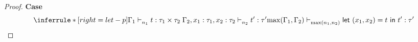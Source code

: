 \documentclass{article}
\begin{document}
\begin{proof}
   
   \noindent \textbf{Case} 
   \[
      \inferrule*[ right = let-p ]
   {\Gamma_1 \jtype{n_1}{}{t}{\tau_1 \times \tau_2 } \\ \Gamma_2, x_1: \tau_1, x_2 : \tau_2 \jtype{n_2}{}{t'}{\tau'}}
   { \max(\Gamma_1,\Gamma_2)  \jtype{\max(n_1,n_2)}{}{ \letx{(x_1,x_2)}{t}{t'} }{\tau'}  }
   \]
   
   
\end{proof}


\clearpage

 





  
 
\end{document}
